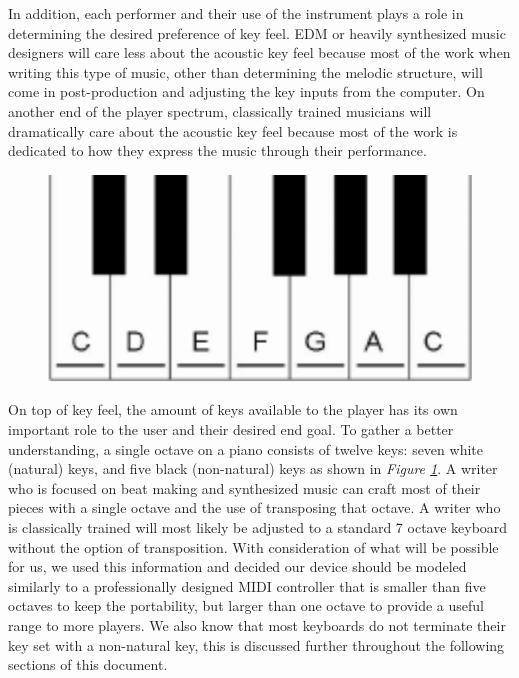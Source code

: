 In addition, each performer and their use of the instrument plays a role in determining the desired preference of key feel. EDM or heavily synthesized music designers will care less about the acoustic key feel because most of the work when writing this type of music, other than determining the melodic structure, will come in post-production and adjusting the key inputs from the computer. On another end of the player spectrum, classically trained musicians will dramatically care about the acoustic key feel because most of the work is dedicated to how they express the music through their performance.

\begin{figure}[h!]
  \centering
  \includegraphics[width=0.5\linewidth]{image/Octave.png}
  \caption{}
  \label{fig:octave}
\end{figure}

On top of key feel, the amount of keys available to the player has its own important role to the user and their desired end goal. To gather a better understanding, a single octave on a piano consists of twelve keys: seven white (natural) keys, and five black (non-natural) keys as shown in \textit{Figure \ref{fig:octave}}. A writer who is focused on beat making and synthesized music can craft most of their pieces with a single octave and the use of transposing that octave. A writer who is classically trained will most likely be adjusted to a standard 7 octave keyboard without the option of transposition. With consideration of what will be possible for us, we used this information and decided our device should be modeled similarly to a professionally designed MIDI controller that is smaller than five octaves to keep the portability, but larger than one octave to provide a useful range to more players. We also know that most keyboards do not terminate their key set with a non-natural key, this is discussed further throughout the following sections of this document.

